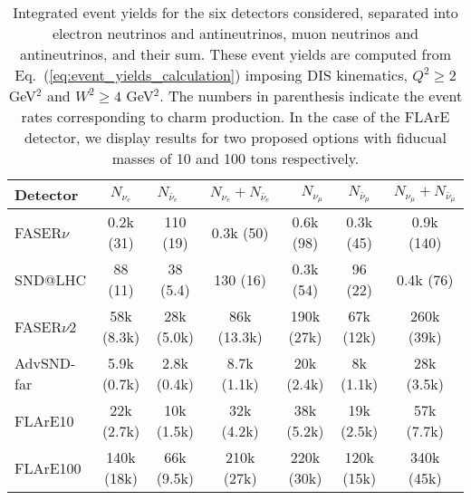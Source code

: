 \begin{table}[t]
  \centering
  \small
  \renewcommand{\arraystretch}{1.70}
\begin{tabularx}{\textwidth}{X||c|c|c||c|c|c}
\toprule
Detector & $\quad$ $N_{\nu_e}$ $\quad$ &$\quad$ $N_{\bar{\nu}_e}$$\quad$   &   $N_{\nu_e} + N_{\bar{\nu}_e}$ &
$\quad$$N_{\nu_\mu}$ $\quad$ & $\quad$ $N_{\bar{\nu}_\mu}$ $\quad$  &   $N_{\nu_\mu} + N_{\bar{\nu}_\mu}$ \\
\midrule
\midrule
FASER$\nu$  & 0.2k (31)    & 110 (19)  & 0.3k (50)  &  0.6k (98)  &  0.3k (45)  &  0.9k (140) \\
SND@LHC  &  88 (11)  & 38 (5.4)    & 130 (16)   &  0.3k (54) & 96 (22)   &  0.4k  (76)\\
\midrule
\midrule
FASER$\nu$2  & 58k (8.3k)   & 28k (5.0k)   & 86k (13.3k)  & 190k (27k)  & 67k (12k)    & 260k (39k)   \\
AdvSND-far  &  5.9k (0.7k)  & 2.8k (0.4k)   & 8.7k (1.1k)  & 20k (2.4k)  & 8k (1.1k)   & 28k (3.5k)   \\
FLArE10 & 22k (2.7k) & 10k (1.5k)   &  32k (4.2k) &  38k (5.2k)&   19k (2.5k) &   57k (7.7k) \\
FLArE100 &   140k (18k)         &    66k (9.5k)         &       210k (27k)       &   220k (30k)      &  120k (15k)    &  340k (45k)  \\
  \bottomrule
\end{tabularx}
\vspace{0.2cm}
\caption{\small Integrated event yields for the six detectors considered,
  separated into electron neutrinos and antineutrinos,
  muon neutrinos and antineutrinos, and their sum.
  These event yields are computed from Eq.~(\ref{eq:event_yields_calculation})
  imposing DIS kinematics, $Q^2 \ge 2$ GeV$^2$ and $W^2 \ge 4$ GeV$^2$.
 The numbers in parenthesis indicate the event rates corresponding to charm
 production.
 In the case of the FLArE detector, we display results for two proposed
 options with fiducual masses of 10 and 100 tons respectively.
  \label{tab:integrated_rates}
}
\end{table}
